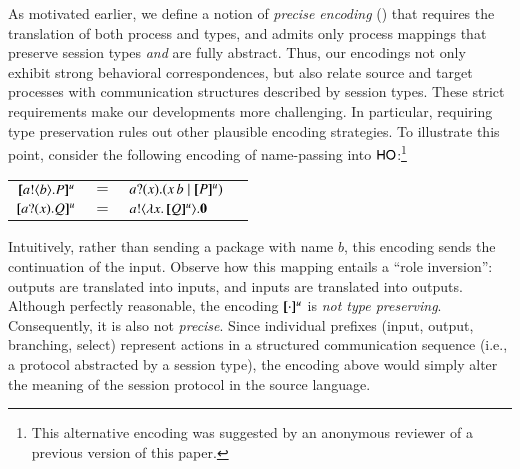 As motivated earlier,
we define a notion of \emph{precise encoding} () that
requires the translation of both process and types, and 
admits only process mappings that preserve session types
\emph{and} are fully abstract. Thus, our encodings 
not only exhibit   strong behavioral correspondences, but also 
 relate source and target processes with  
communication structures described by session types.
These strict requirements make our developments more challenging.
In particular, requiring type preservation rules out other plausible encoding strategies.
To illustrate this point,
consider the  following encoding of %
name-passing 
into $\mathsf{HO}$:\footnote{This alternative  encoding was suggested by an anonymous reviewer of a previous version of this paper.} %
\begin{center}
\begin{tabular}{rcll}
  $[\!\![a ! \langle b \rangle . P]\!\!]^u$	&$=$&	$a ? (x) .( x\, {b} \;|\; [\!\![P]\!\!]^u)$ \\
  $[\!\![a ? (x) . Q]\!\!]^u$	&$=$&	$a ! \langle \lambda x.\,[\!\![Q]\!\!]^u \rangle . \mathbf{0}$
\end{tabular}
\end{center}
Intuitively, 
rather than sending a package with name $b$, 
this encoding sends the continuation of the input. Observe how this mapping entails  a 
``role inversion'': outputs are translated into inputs, and inputs are translated into outputs. 
Although perfectly reasonable, the encoding $[\!\![\cdot]\!\!]^u$  
is \emph{not type preserving}. Consequently, it is also not \emph{precise}.
Since individual prefixes (input, output, branching, select) 
represent actions in a structured communication sequence (i.e., a protocol abstracted by a session type),
the encoding above would simply alter the meaning of the session protocol in the source language.




